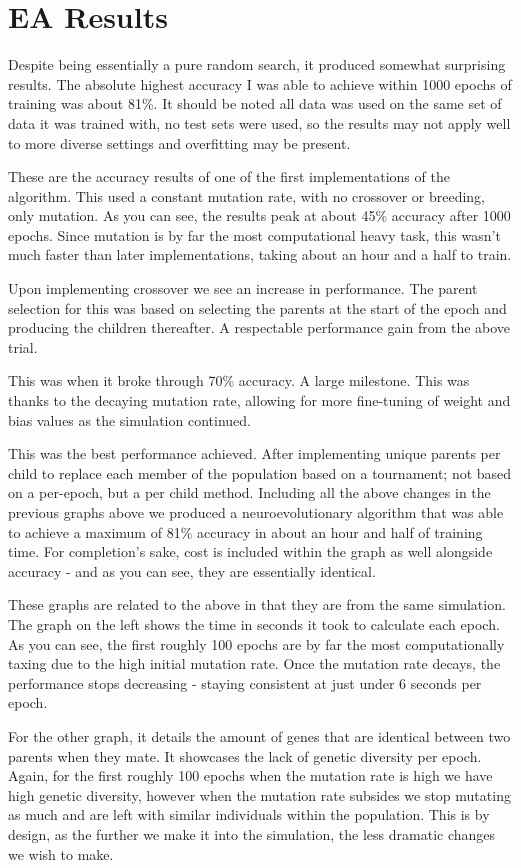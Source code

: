 \documentclass[12pt]{report}
\begin{document}
\section*{EA Results}
Despite being essentially a pure random search,
it produced somewhat surprising results. The absolute highest accuracy I was able to achieve
within 1000 epochs of training was about 81\%. It should be noted all data was used
on the same set of data it was trained with, no test sets were used, so the results
may not apply well to more diverse settings and overfitting may be present.

These are the accuracy results of one of the first implementations of the algorithm. 
This used a constant mutation rate, with no crossover or breeding, only
mutation. As you can see, the results peak at about 45\% accuracy after 1000 epochs.
Since mutation is by far the most computational heavy task, this wasn't much faster than
later implementations, taking about an hour and a half to train.


Upon implementing crossover we see an increase in performance.
The parent selection for this was based on selecting the parents at the start of the
epoch and producing the children thereafter. A respectable performance gain from the
above trial.


This was when it broke through 70\% accuracy. A large milestone. This was thanks to
the decaying mutation rate, allowing for more fine-tuning of weight and bias values
as the simulation continued.

This was the best performance achieved. After implementing unique parents per child
to replace each member of the population based on a tournament; not based on a per-epoch,
but a per child method. Including all the above changes in
the previous graphs above we produced a
neuroevolutionary algorithm that was able to achieve a maximum of 81\% accuracy in about
an hour and half of training time. For completion's sake, cost is included within
the graph as well
alongside accuracy - and as you can see, they are essentially identical. 
\newline


These graphs are related to the above in that they are from the same simulation.
The graph on the left shows the time in seconds it took to calculate each epoch. As
you can see, the first roughly 100 epochs are by far the most computationally taxing due
to the high initial mutation rate. Once the mutation rate decays, the performance
stops decreasing - staying consistent at just under 6 seconds per epoch.
\par For the other graph, it details the amount of genes that are identical between
two parents when they mate. It showcases the lack of genetic diversity per epoch.
Again, for the first roughly 100 epochs when the mutation rate is high we have 
high genetic diversity, however when the mutation rate subsides we stop mutating as
much and are left with similar individuals within the population. This is by design,
as the further we make it into the simulation, the less dramatic changes we wish 
to make.
\end{document}

